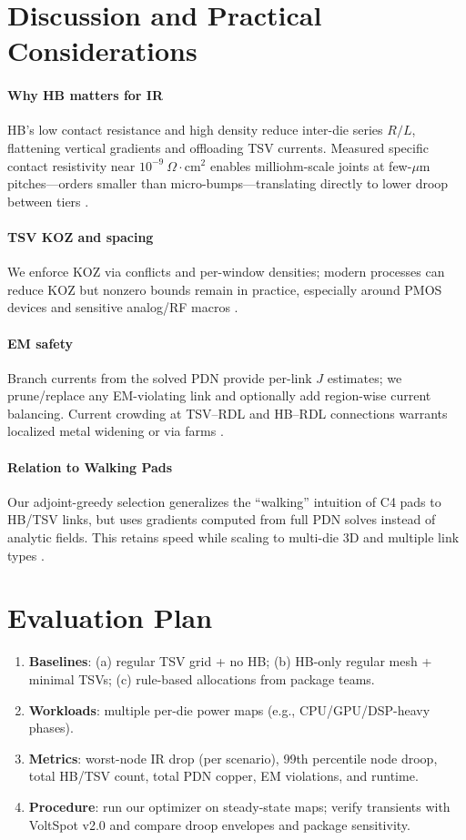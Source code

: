 \documentclass[conference]{IEEEtran}
\begin{document}
\section{Discussion and Practical Considerations}
\paragraph*{Why HB matters for IR}
HB’s low contact resistance and high density reduce inter-die series $R/L$, flattening vertical gradients and offloading TSV currents. Measured specific contact resistivity near $10^{-9}\ \Omega\cdot\mathrm{cm}^2$ enables milliohm-scale joints at few-$\mu$m pitches---orders smaller than micro-bumps---translating directly to lower droop between tiers \cite{HBContact2022,IEEESpectrumHB,TomsHC33,SonyECTC2025}.

\paragraph*{TSV KOZ and spacing}
We enforce KOZ via conflicts and per-window densities; modern processes can reduce KOZ but nonzero bounds remain in practice, especially around PMOS devices and sensitive analog/RF macros \cite{KOZPatent,GFNearZeroKOZ}.

\paragraph*{EM safety}
Branch currents from the solved PDN provide per-link $J$ estimates; we prune/replace any EM-violating link and optionally add region-wise current balancing. Current crowding at TSV–RDL and HB–RDL connections warrants localized metal widening or via farms \cite{EMCuCuPubMed,TVLSIEMC4}.

\paragraph*{Relation to Walking Pads}
Our adjoint-greedy selection generalizes the “walking” intuition of C4 pads to HB/TSV links, but uses gradients computed from full PDN solves instead of analytic fields. This retains speed while scaling to multi-die 3D and multiple link types \cite{WangPatent}.

\section{Evaluation Plan}
\begin{enumerate}[leftmargin=*,nosep]
\item \textbf{Baselines}: (a) regular TSV grid + no HB; (b) HB-only regular mesh + minimal TSVs; (c) rule-based allocations from package teams.
\item \textbf{Workloads}: multiple per-die power maps (e.g., CPU/GPU/DSP-heavy phases). 
\item \textbf{Metrics}: worst-node IR drop (per scenario), 99th percentile node droop, total HB/TSV count, total PDN copper, EM violations, and runtime.
\item \textbf{Procedure}: run our optimizer on steady-state maps; verify transients with VoltSpot v2.0 and compare droop envelopes and package sensitivity.
\end{enumerate}
\end{document}
